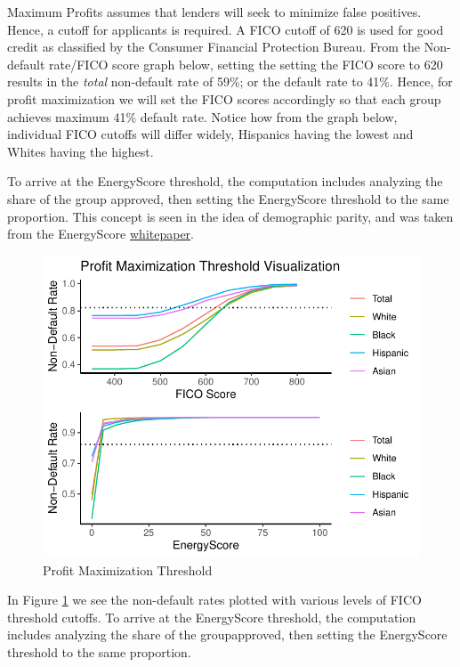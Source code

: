 \documentclass[11pt,]{article}
\begin{document}
Maximum Profits assumes that lenders will seek to minimize false
positives. Hence, a cutoff for applicants is required. A FICO cutoff of
620 is used for good credit as classified by the Consumer Financial
Protection Bureau. From the Non-default rate/FICO score graph below,
setting the setting the FICO score to 620 results in the \emph{total}
non-default rate of 59\%; or the default rate to 41\%. Hence, for profit
maximization we will set the FICO scores accordingly so that each group
achieves maximum 41\% default rate. Notice how from the graph below,
individual FICO cutoffs will differ widely, Hispanics having the lowest
and Whites having the highest.

To arrive at the EnergyScore threshold, the computation includes
analyzing the share of the group approved, then setting the EnergyScore
threshold to the same proportion. This concept is seen in the idea of
demographic parity, and was taken from the EnergyScore
\href{https://solstice.us/wp-content/uploads/EnergyScore-White-Paper-1.pdf}{whitepaper}.

\begin{figure}
\centering
\includegraphics{figs/profitmax.pdf}
\caption{\label{fig:profitmax}Profit Maximization Threshold}
\end{figure}

In Figure \ref{fig:profitmax} we see the non-default rates plotted with
various levels of FICO threshold cutoffs. To arrive at the EnergyScore
threshold, the computation includes analyzing the share of the
groupapproved, then setting the EnergyScore threshold to the same
proportion.
\end{document}
